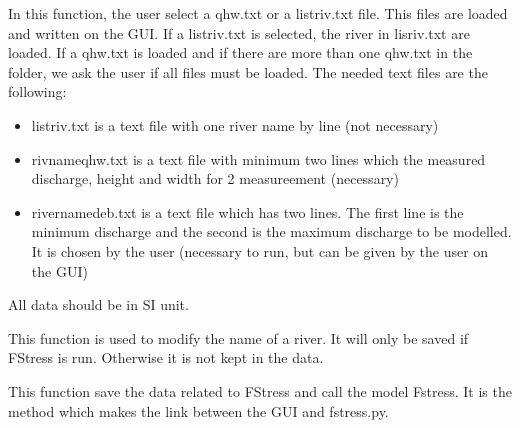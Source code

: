 \documentclass[letterpaper,10pt,english]{sphinxmanual}
\begin{document}
\begin{fulllineitems}
\begin{fulllineitems}
\label{\detokenize{index:src_GUI.fstress_GUI.FstressW.load_txt}}
In this function, the user select a qhw.txt or a listriv.txt file. This files are loaded and written on the GUI.
If a listriv.txt is selected, the river in lisriv.txt are loaded. If a qhw.txt is loaded and if there are
more than one qhw.txt in the folder, we ask the user if all files must be loaded. The needed text files are
the following:
\begin{itemize}
\item {} 
listriv.txt is a text file with one river name by line (not necessary)

\item {} 
rivnameqhw.txt is a text file with minimum two lines which the measured discharge, height and width for
2 measureement (necessary)

\item {} 
rivernamedeb.txt is a text file which has two lines. The first line is the minimum discharge and the second is
the maximum discharge to be modelled. It is chosen by the user (necessary to run, but can be given by the user
on the GUI)

\end{itemize}

All data should be in SI unit.

\end{fulllineitems}


\begin{fulllineitems}
\label{\detokenize{index:src_GUI.fstress_GUI.FstressW.modify_name}}
This function is used to modify the name of a river. It will only be saved if FStress is run. Otherwise it
is not kept in the data.

\end{fulllineitems}


\begin{fulllineitems}
\label{\detokenize{index:src_GUI.fstress_GUI.FstressW.runsave_fstress}}
This function save the data related to FStress and call the model Fstress. It is the method which makes the
link between the GUI and fstress.py.


\end{fulllineitems}
\end{fulllineitems}
\end{document}
